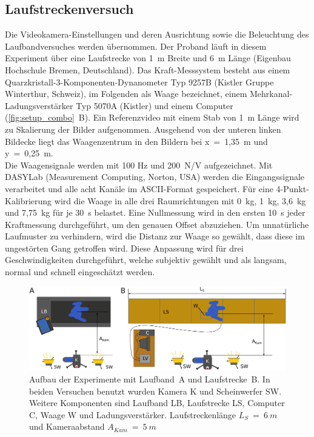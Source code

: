 \subsection{Laufstreckenversuch}
Die Videokamera-Einstellungen und deren Ausrichtung sowie die Beleuchtung des Laufbandversuches werden übernommen. Der Proband läuft in diesem Experiment über eine Laufstrecke von 1~m Breite und 6~m Länge (Eigenbau Hochschule Bremen, Deutschland). Das Kraft-Messsystem besteht aus einem Quarzkristall-3-Komponenten-Dynanometer Typ 9257B (Kistler Gruppe Winterthur, Schweiz), im Folgenden als Waage bezeichnet, einem Mehrkanal-Ladungsverstärker Typ 5070A (Kistler) und einem Computer (\autoref{fig:setup_combo}~B). Ein Referenzvideo mit einem Stab von 1~m Länge wird zu Skalierung der Bilder aufgenommen. Ausgehend von der unteren linken Bildecke liegt das Waagenzentrum in den Bildern bei x~=~1,35~m und y~=~0,25~m.\\
Die Waagensignale werden mit 100 Hz und 200~N/V aufgezeichnet. Mit DASYLab (Measurement Computing, Norton, USA) werden die Eingangssignale verarbeitet und alle acht Kanäle im ASCII-Format gespeichert. Für eine 4-Punkt-Kalibrierung wird die Waage in alle drei Raumrichtungen mit 0~kg, 1~kg, 3,6~kg und 7,75~kg für je 30~s belastet. Eine Nullmessung wird in den ersten 10~s jeder Kraftmessung durchgeführt, um den genauen Offset abzuziehen. Um unnatürliche Laufmuster zu verhindern, wird die Distanz zur Waage so gewählt, dass diese im ungestörten Gang getroffen wird. Diese Anpassung wird für drei Geschwindigkeiten durchgeführt, welche subjektiv gewählt und als langsam, normal und schnell eingeschätzt werden.
\begin{figure}[h!]
	\centering
	\includegraphics[width=\linewidth]{bilder/mat_met/Setup_combo}
	\caption[Aufbau Laufband- und Laufstreckenversuch]{Aufbau der Experimente mit Laufband~A und Laufstrecke~B. In beiden Versuchen benutzt wurden Kamera K und Scheinwerfer SW. Weitere Komponenten sind Laufband LB, Laufstrecke LS, Computer C, Waage W und Ladungsverstärker. Laufstreckenlänge $L_S~=~6~m$ und Kameraabstand $A_{Kam}~=~5~m$}
	\label{fig:setup_combo}
\end{figure}

